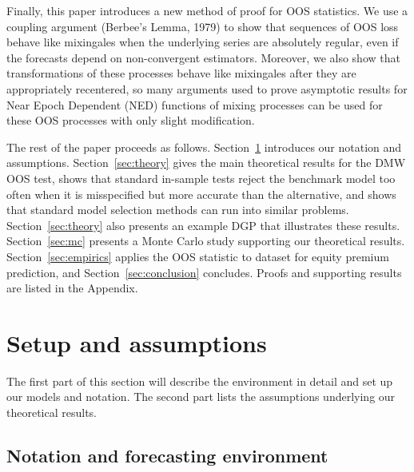 \documentclass[12pt,draft]{article}
\begin{document}
Finally, this paper introduces a new method of proof for OOS
statistics.  We use a coupling argument (Berbee's Lemma, 1979) to show
that sequences of OOS loss behave like mixingales when the
underlying series are absolutely regular, even if the forecasts depend
on non-convergent estimators.  Moreover, we also show that transformations of these
processes behave like mixingales after they are appropriately recentered, so
many arguments used to prove asymptotic
results for Near Epoch Dependent (NED) functions of mixing processes
can be used for these OOS processes with only slight modification.

The rest of the paper proceeds as follows.
Section~\ref{sec:assumptions} introduces our notation and assumptions.
Section~\ref{sec:theory} gives the main theoretical results for the
DMW OOS test, shows that standard in-sample tests reject the
benchmark model too often when it is misspecified but more accurate than the
alternative, and shows that standard model selection methods can run
into similar problems. Section~\ref{sec:theory} also presents an
example DGP that illustrates these results. Section~\ref{sec:mc}
presents a Monte Carlo study supporting our theoretical results.
Section~\ref{sec:empirics} applies the OOS statistic to
 dataset for equity premium prediction, and
Section~\ref{sec:conclusion} concludes.  Proofs and supporting results
are listed in the Appendix.

\section{Setup and assumptions}
\label{sec:assumptions}

The first part of this section will describe the environment in detail
and set up our models and notation. The second part lists the
assumptions underlying our theoretical results.

\subsection{Notation and forecasting environment}
\end{document}
